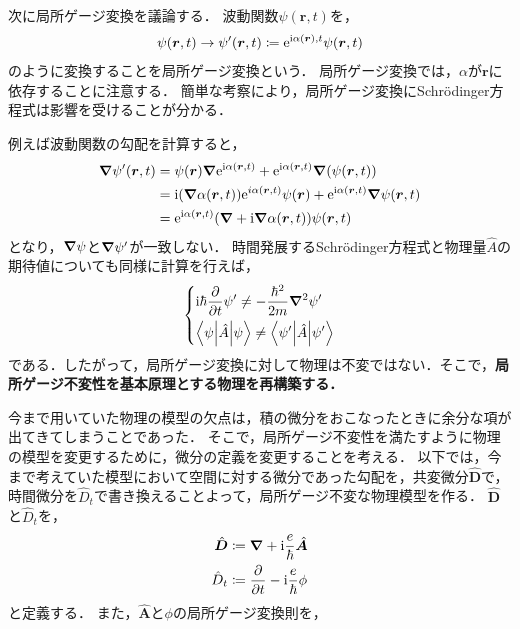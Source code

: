 \documentclass{report}
\begin{document}
  次に局所ゲージ変換を議論する．
  波動関数$\psi(\bm{r}, t)$を，
  \begin{align}
    \psi(\bm{r}, t) \to \psi'(\bm{r}, t) \coloneqq \mathrm{e}^{\mathrm{i}\alpha(\bm{r}), t}\psi(\bm{r}, t)
  \end{align}
  のように変換することを局所ゲージ変換という．
  局所ゲージ変換では，$\alpha$が$\bm{r}$に依存することに注意する．
  簡単な考察により，局所ゲージ変換にSchr\"odinger方程式は影響を受けることが分かる．
  \par
  例えば波動関数の勾配を計算すると，
  \begin{align}
    \grad\psi'(\bm{r}, t) &= \psi(\bm{r})\grad\mathrm{e}^{\mathrm{i}\alpha(\bm{r}, t)} + \mathrm{e}^{\mathrm{i}\alpha(\bm{r}, t)}\grad\qty(\psi(\bm{r}, t)) \\ 
    &= \mathrm{i}\qty(\grad\alpha(\bm{r}, t))  \mathrm{e}^{i\alpha(\bm{r}, t)}\psi(\bm{r}) + \mathrm{e}^{\mathrm{i}\alpha(\bm{r}, t)}\grad\psi(\bm{r}, t) \\ 
    &= \mathrm{e}^{\mathrm{i}\alpha(\bm{r}, t)}(\grad + \mathrm{i}\grad\alpha(\bm{r}, t))\psi(\bm{r}, t) 
  \end{align}
  となり，$\grad\psi$と$\grad\psi'$が一致しない．
  時間発展するSchr\"odinger方程式と物理量$\hat{A}$の期待値についても同様に計算を行えば，
  \begin{align}
    \begin{dcases}
      \mathrm{i}\hbar\pdv{t}\psi' \neq - \frac{\hbar^2}{2m}\grad^2\psi' \\
      \mel**{\psi}{\hat{A}}{\psi} \neq \mel**{\psi'}{\hat{A}}{\psi'}
    \end{dcases}
  \end{align}
  である．したがって，局所ゲージ変換に対して物理は不変ではない．そこで，\textbf{局所ゲージ不変性を基本原理とする物理を再構築する．}%
  \par
  今まで用いていた物理の模型の欠点は，積の微分をおこなったときに余分な項が出てきてしまうことであった．
  そこで，局所ゲージ不変性を満たすように物理の模型を変更するために，微分の定義を変更することを考える．
  以下では，今まで考えていた模型において空間に対する微分であった勾配を，共変微分$\hat{\bm{D}}$で，時間微分を$\hat{D}_t$で書き換えることよって，局所ゲージ不変な物理模型を作る．
  $\hat{\bm{D}}$と$\hat{D}_t$を，
  \begin{align}
    \hat{\bm{D}} &\coloneqq \grad + \mathrm{i}\frac{e}{\hbar}\hat{\bm{A}} \label{hatd-def}\\ 
    \hat{D}_t &\coloneqq \pdv{t} - \mathrm{i}\frac{e}{\hbar}\phi \label{hatdt-def}
  \end{align}
  と定義する．
  また，$\hat{\bm{A}}$と$\phi$の局所ゲージ変換則を，
\end{document}
